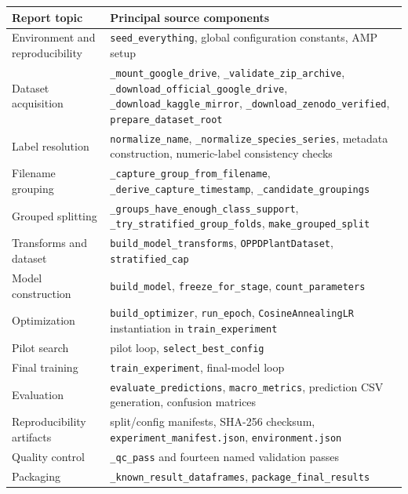 \documentclass[11pt,a4paper]{article}
\begin{document}
\begin{center}
\small
{\scriptsize\setlength{\tabcolsep}{2.5pt}\begin{tabularx}{0.98\textwidth}{>{\raggedright\arraybackslash}p{}X}
\toprule
Report topic & Principal source components \\
\midrule
Environment and reproducibility & \texttt{seed\_everything}, global configuration constants, AMP setup \\
Dataset acquisition & \texttt{\_mount\_google\_drive}, \texttt{\_validate\_zip\_archive}, \texttt{\_download\_official\_google\_drive}, \texttt{\_download\_kaggle\_mirror}, \texttt{\_download\_zenodo\_verified}, \texttt{prepare\_dataset\_root} \\
Label resolution & \texttt{normalize\_name}, \texttt{\_normalize\_species\_series}, metadata construction, numeric-label consistency checks \\
Filename grouping & \texttt{\_capture\_group\_from\_filename}, \texttt{\_derive\_capture\_timestamp}, \texttt{\_candidate\_groupings} \\
Grouped splitting & \texttt{\_groups\_have\_enough\_class\_support}, \texttt{\_try\_stratified\_group\_folds}, \texttt{make\_grouped\_split} \\
Transforms and dataset & \texttt{build\_model\_transforms}, \texttt{OPPDPlantDataset}, \texttt{stratified\_cap} \\
Model construction & \texttt{build\_model}, \texttt{freeze\_for\_stage}, \texttt{count\_parameters} \\
Optimization & \texttt{build\_optimizer}, \texttt{run\_epoch}, \texttt{CosineAnnealingLR} instantiation in \texttt{train\_experiment} \\
Pilot search & pilot loop, \texttt{select\_best\_config} \\
Final training & \texttt{train\_experiment}, final-model loop \\
Evaluation & \texttt{evaluate\_predictions}, \texttt{macro\_metrics}, prediction CSV generation, confusion matrices \\
Reproducibility artifacts & split/config manifests, SHA-256 checksum, \texttt{experiment\_manifest.json}, \texttt{environment.json} \\
Quality control & \texttt{\_qc\_pass} and fourteen named validation passes \\
Packaging & \texttt{\_known\_result\_dataframes}, \texttt{package\_final\_results} \\
\bottomrule
\end{tabularx}}
\end{center}
\end{document}
